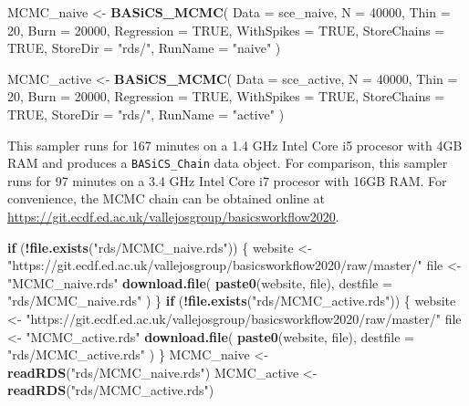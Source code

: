 \documentclass[9pt,a4paper,]{extarticle}
\newenvironment{Shaded}{\begin{snugshade}}{\end{snugshade}}
\newcommand{\ControlFlowTok}[1]{\textcolor[rgb]{0.13,0.29,0.53}{\textbf{#1}}}
\newcommand{\DataTypeTok}[1]{\textcolor[rgb]{0.13,0.29,0.53}{#1}}
\newcommand{\DecValTok}[1]{\textcolor[rgb]{0.00,0.00,0.81}{#1}}
\newcommand{\KeywordTok}[1]{\textcolor[rgb]{0.13,0.29,0.53}{\textbf{#1}}}
\newcommand{\NormalTok}[1]{#1}
\newcommand{\OperatorTok}[1]{\textcolor[rgb]{0.81,0.36,0.00}{\textbf{#1}}}
\newcommand{\OtherTok}[1]{\textcolor[rgb]{0.56,0.35,0.01}{#1}}
\newcommand{\StringTok}[1]{\textcolor[rgb]{0.31,0.60,0.02}{#1}}
\begin{document}
\begin{Shaded}
\begin{Highlighting}[]
\NormalTok{MCMC_naive <-}\StringTok{ }\KeywordTok{BASiCS_MCMC}\NormalTok{(}
  \DataTypeTok{Data =}\NormalTok{ sce_naive,}
  \DataTypeTok{N =} \DecValTok{40000}\NormalTok{,}
  \DataTypeTok{Thin =} \DecValTok{20}\NormalTok{,}
  \DataTypeTok{Burn =} \DecValTok{20000}\NormalTok{,}
  \DataTypeTok{Regression =} \OtherTok{TRUE}\NormalTok{,}
  \DataTypeTok{WithSpikes =} \OtherTok{TRUE}\NormalTok{,}
  \DataTypeTok{StoreChains =} \OtherTok{TRUE}\NormalTok{, }
  \DataTypeTok{StoreDir =} \StringTok{"rds/"}\NormalTok{, }
  \DataTypeTok{RunName =} \StringTok{"naive"}
\NormalTok{)}

\NormalTok{MCMC_active <-}\StringTok{ }\KeywordTok{BASiCS_MCMC}\NormalTok{(}
  \DataTypeTok{Data =}\NormalTok{ sce_active,}
  \DataTypeTok{N =} \DecValTok{40000}\NormalTok{,}
  \DataTypeTok{Thin =} \DecValTok{20}\NormalTok{,}
  \DataTypeTok{Burn =} \DecValTok{20000}\NormalTok{,}
  \DataTypeTok{Regression =} \OtherTok{TRUE}\NormalTok{,}
  \DataTypeTok{WithSpikes =} \OtherTok{TRUE}\NormalTok{,}
  \DataTypeTok{StoreChains =} \OtherTok{TRUE}\NormalTok{, }
  \DataTypeTok{StoreDir =} \StringTok{"rds/"}\NormalTok{, }
  \DataTypeTok{RunName =} \StringTok{"active"}
\NormalTok{)}
\end{Highlighting}
\end{Shaded}

This sampler runs for 167 minutes on a 1.4 GHz Intel Core i5 procesor with 4GB
RAM and produces a \texttt{BASiCS\_Chain} data object.
For comparison, this sampler runs for 97 minutes on a 3.4 GHz Intel Core
i7 procesor with 16GB RAM.
For convenience, the MCMC chain can be obtained online at
\url{https://git.ecdf.ed.ac.uk/vallejosgroup/basicsworkflow2020}.

\begin{Shaded}
\begin{Highlighting}[]
\ControlFlowTok{if}\NormalTok{ (}\OperatorTok{!}\KeywordTok{file.exists}\NormalTok{(}\StringTok{"rds/MCMC_naive.rds"}\NormalTok{)) \{}
\NormalTok{  website <-}\StringTok{ "https://git.ecdf.ed.ac.uk/vallejosgroup/basicsworkflow2020/raw/master/"}
\NormalTok{  file <-}\StringTok{ "MCMC_naive.rds"}
  \KeywordTok{download.file}\NormalTok{(}
    \KeywordTok{paste0}\NormalTok{(website, file),}
    \DataTypeTok{destfile =} \StringTok{"rds/MCMC_naive.rds"}
\NormalTok{  )  }
\NormalTok{\}}
\ControlFlowTok{if}\NormalTok{ (}\OperatorTok{!}\KeywordTok{file.exists}\NormalTok{(}\StringTok{"rds/MCMC_active.rds"}\NormalTok{)) \{}
\NormalTok{  website <-}\StringTok{ "https://git.ecdf.ed.ac.uk/vallejosgroup/basicsworkflow2020/raw/master/"}
\NormalTok{  file <-}\StringTok{ "MCMC_active.rds"}
  \KeywordTok{download.file}\NormalTok{(}
    \KeywordTok{paste0}\NormalTok{(website, file),}
    \DataTypeTok{destfile =} \StringTok{"rds/MCMC_active.rds"}
\NormalTok{  )  }
\NormalTok{\}}
\NormalTok{MCMC_naive <-}\StringTok{ }\KeywordTok{readRDS}\NormalTok{(}\StringTok{"rds/MCMC_naive.rds"}\NormalTok{)}
\NormalTok{MCMC_active <-}\StringTok{ }\KeywordTok{readRDS}\NormalTok{(}\StringTok{"rds/MCMC_active.rds"}\NormalTok{)}
\end{Highlighting}
\end{Shaded}
\end{document}
